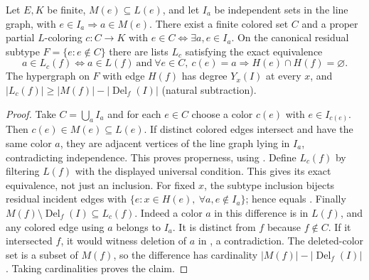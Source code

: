 \begin{lemma}
Let $E,K$ be finite, $M(e)\subseteq L(e)$, and let $I_a$ be independent
sets in the line graph, with $e\in I_a\Rightarrow a\in M(e)$.
There exist a finite colored set $C$ and a proper partial $L$-coloring
$c:C\to K$ with $e\in C\iff\exists a,e\in I_a$.
On the canonical residual subtype $F=\{e:e\notin C\}$ there are lists
$L_c$ satisfying the exact equivalence
\[
a\in L_c(f)\iff a\in L(f)\ \text{and}\
\forall e\in C,\ c(e)=a\Rightarrow H(e)\cap H(f)=\varnothing.
\]
The hypergraph on $F$ with edge $H(f)$ has degree $Y_x(I)$ at every $x$,
and $|L_c(f)|\ge |M(f)|-|\operatorname{Del}_f(I)|$ (natural subtraction).
\end{lemma}
\begin{proof}
Take $C=\bigcup_a I_a$ and for each $e\in C$ choose a color $c(e)$ with
$e\in I_{c(e)}$. Then $c(e)\in M(e)\subseteq L(e)$. If distinct colored
edges intersect and have the same color $a$, they are adjacent vertices
of the line graph lying in $I_a$, contradicting independence. This proves
properness, using \noderef{LineGraphOfHypergraph}.
Define $L_c(f)$ by filtering $L(f)$ with the displayed universal condition.
This gives its exact equivalence, not just an inclusion. For fixed $x$,
the subtype inclusion bijects residual incident edges with
$\{e:x\in H(e),\ \forall a,e\notin I_a\}$; hence
 equals .
Finally $M(f)\setminus\operatorname{Del}_f(I)\subseteq L_c(f)$.
Indeed a color $a$ in this difference is in $L(f)$, and any colored edge
using $a$ belongs to $I_a$. It is distinct from $f$ because $f\notin C$.
If it intersected $f$, it would witness deletion of $a$ in
, a contradiction. The deleted-color set is
a subset of $M(f)$, so the difference has cardinality
$|M(f)|-|\operatorname{Del}_f(I)|$. Taking cardinalities proves the claim.
\end{proof}
